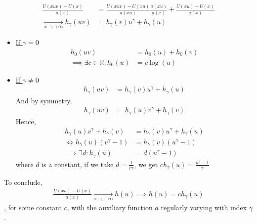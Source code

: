 \begin{equation}
\begin{alignat*}{2}
\frac{U(x u v) - U(x)}{a(x)} &= \frac{U(x u v) - U(x u)}{a(x u)} \frac{a(x u)}{a(x)} + \frac{U(x u) - U(x)}{a(x)} \\
\xrightarrow[x \rightarrow + \infty]{} h_\gamma(u v) &= h_\gamma(v) u^\gamma + h_\gamma(u)
\end{alignat*}
\end{equation}
\begin{itemize}
	\item \underline{If $\gamma = 0$} \\
	\begin{equation}
	\begin{alignat*}{2}
	h_0(u v) &= h_0(u) + h_0(v) \\
	\implies \exists c \in \mathbb{R} : h_0(u) &= c \log(u)
	\end{alignat*}
	\end{equation}\newline
	\item \underline{If $\gamma \ne 0$}
		\begin{equation}
		\begin{alignat*}{2}
		h_\gamma(u v) &= h_\gamma(v) u^\gamma + h_\gamma(u)
		\end{alignat*}
		\end{equation} And by symmetry,
		\begin{equation}
		\begin{alignat*}{2}
		h_\gamma(u v) &= h_\gamma(u) v^\gamma + h_\gamma(v)
		\end{alignat*}
		\end{equation} Hence,
		\begin{equation}
		\begin{alignat*}{2}
		h_\gamma(u) v^\gamma + h_\gamma(v) &= h_\gamma(v) u^\gamma + h_\gamma(u) \\
		\iff h_\gamma(u) (v^\gamma - 1) &= h_\gamma(v) (u^\gamma - 1) \\
		\implies \exists d : h_\gamma(u) &= d (u^\gamma - 1)
		\end{alignat*}
		\end{equation} where $d$ is a constant, if we take $d = \frac{1}{c \gamma}$, we get $c h_\gamma(u) = \frac{u^\gamma - 1}{\gamma}$
\end{itemize}
To conclude,
\begin{equation}
\begin{alignat*}{2}
\frac{U(x u) - U(x)}{a(x)} \xrightarrow[x \rightarrow + \infty]{} h(u)
\implies h(u) = c h_\gamma(u)
\end{alignat*}
\end{equation}, for some constant $c$, with the auxiliary function $a$ regularly varying with index $\gamma$.
